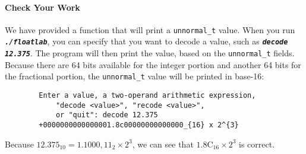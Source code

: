 \paragraph*{Check Your Work}

\begin{description}
\end{description}
We have provided a function that will print a \lstinline{unnormal_t} value.
When you run \texttt{\textbf{\textit{./floatlab}}}, you can specify that you want to decode a value, such as \texttt{\textbf{\textit{decode 12.375}}}.
The program will then print the value, based on the \lstinline{unnormal_t} fields.
Because there are 64 bits available for the integer portion and another 64 bits for the fractional portion, the \lstinline{unnormal_t} value will be printed in base-16:

\begin{verbatim}
        Enter a value, a two-operand arithmetic expression,
            "decode <value>", "recode <value>",
            or "quit": decode 12.375
        +0000000000000001.8c00000000000000_{16} x 2^{3}
\end{verbatim}

Because $12.375_{10} = 1.1000,11_{2} \times 2^3$, we can see that $1.8\mathrm{C}_{16} \times 2^3$ is correct.

%
%
%

\begin{description}
\end{description}